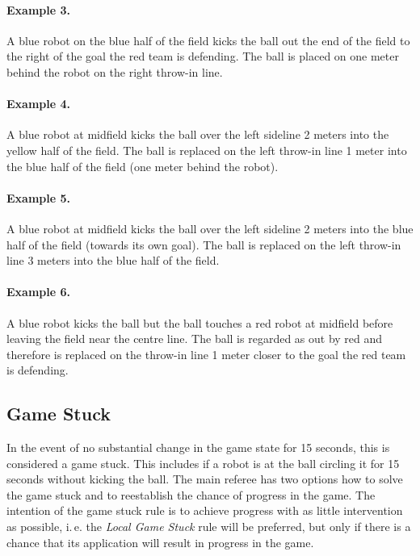 \documentclass[12pt]{article}
\newcommand{\ie}{\mbox{i.\,e.}\xspace}
\begin{document}
\paragraph{Example 3.} A blue robot on the blue half of the field kicks the ball out the end of the field to the right of the goal the red team is defending. The ball is placed on one meter behind the robot on the right throw-in line.

\paragraph{Example 4.} A blue robot at midfield kicks the ball over the left sideline 2 meters into the yellow half of the field. The ball is replaced on the left throw-in line 1 meter into the blue half of the field (one meter behind the robot).

\paragraph{Example 5.} A blue robot at midfield kicks the ball over the left sideline 2 meters into the blue half of the field (towards its own goal). The ball is replaced on the left throw-in line 3 meters into the blue half of the field.

\paragraph{Example 6.} A blue robot kicks the ball but the ball touches a red robot at midfield before leaving the field near the centre line. The ball is regarded as out by red and therefore is replaced on the throw-in line 1 meter closer to the goal the red team is defending.


\subsection{Game Stuck}
\label{sec:game_stuck}

In the event of no substantial change in the game state for 15 seconds, this is considered a game stuck. 
This includes if a robot is at the ball circling it for 15 seconds without kicking the ball.
The main referee has two options how to solve the game stuck and to reestablish the chance of progress in the game. The intention of the game stuck rule is to achieve progress with as little intervention as possible, \ie the \emph{Local Game Stuck} rule will be preferred, but only if there is a chance that its application will result in progress in the game.
\end{document}

